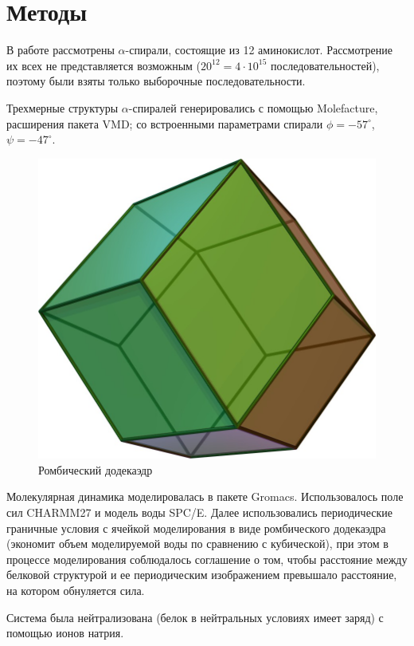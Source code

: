 \documentclass[
11pt,%
tightenlines,%
twoside,%
onecolumn,%
nofloats,%
nobibnotes,%
nofootinbib,%
superscriptaddress,%
noshowpacs,%
centertags]%
{revtex4}
\begin{document}
\section{Методы}
В работе рассмотрены $\alpha$-спирали, состоящие из 12 аминокислот. 
Рассмотрение их всех не представляется возможным ($20^{12} = 4 \cdot 10^{15}$ последовательностей),
поэтому были взяты только выборочные последовательности. \par
Трехмерные структуры $\alpha$-спиралей генерировались с помощью Molefacture, расширения пакета VMD;
со встроенными параметрами спирали $\phi = -57^{\circ}$, $\psi = -47^{\circ}$. \par
\begin{figure}
	\centering
	\includegraphics[scale=0.2]{Rhombicdodecahedron}
	\caption{Ромбический додекаэдр}
\end{figure}
Молекулярная динамика моделировалась в пакете Gromacs. 
Использовалось поле сил CHARMM27 и модель воды SPC/E. 
Далее использовались периодические граничные условия с ячейкой моделирования 
в виде ромбического додекаэдра (экономит объем моделируемой воды по сравнению с кубической),
при этом в процессе моделирования соблюдалось соглашение о том, 
чтобы расстояние между белковой структурой и ее периодическим изображением превышало расстояние,
на котором обнуляется сила.\par
Система была нейтрализована (белок в нейтральных условиях имеет заряд) с помощью ионов натрия. \par
\end{document}
